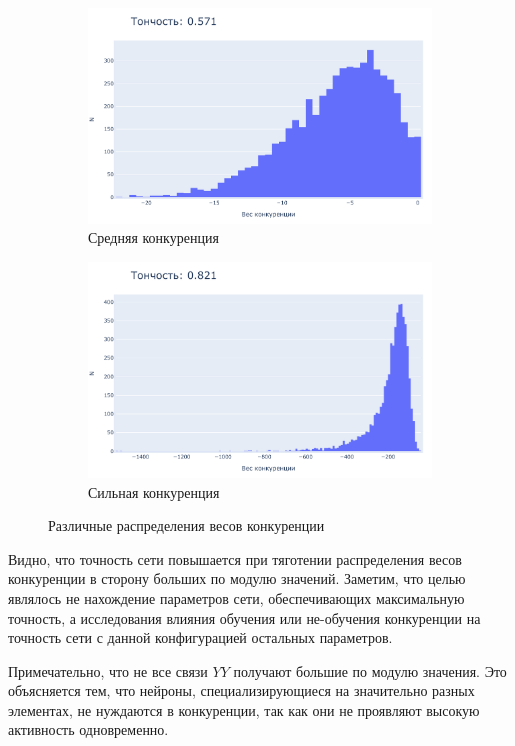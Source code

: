 \documentclass[a4paper]{article}
\begin{document}
\begin{figure}[H]
\begin{subfigure}{0.45\textwidth}
    \includegraphics[width=\textwidth,keepaspectratio=true]{competition_distribution_medium_good_ru.pdf}
    \caption{Средняя конкуренция} 
\end{subfigure}
\begin{subfigure}{0.45\textwidth}
    \includegraphics[width=\textwidth,keepaspectratio=true]{competition_distribution_best_ru.pdf}
    \caption{Сильная конкуренция}
\end{subfigure}
\caption{Различные распределения весов конкуренции}
\end{figure}

Видно, что точность сети повышается при тяготении распределения весов конкуренции в сторону больших по модулю значений. Заметим, что целью являлось не нахождение параметров сети, обеспечивающих максимальную точность, а исследования влияния обучения или не-обучения конкуренции на точность сети с данной конфигурацией остальных параметров.

Примечательно, что не все связи $YY$ получают большие по модулю значения. Это объясняется тем, что нейроны, специализирующиеся на значительно разных элементах, не нуждаются в конкуренции, так как они не проявляют высокую активность одновременно.
\end{document}
